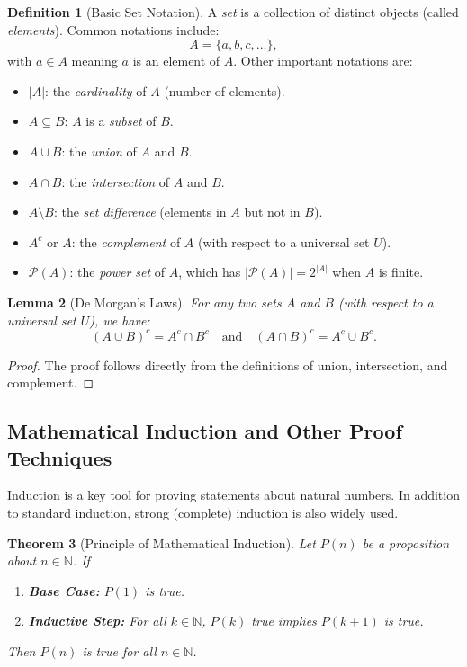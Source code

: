 \documentclass[12pt]{article}
\newtheorem{theorem}{Theorem}[section]
\newtheorem{lemma}[theorem]{Lemma}
\theoremstyle{definition}
\newtheorem{definition}[theorem]{Definition}
\begin{document}
\begin{definition}[Basic Set Notation]
  A \emph{set} is a collection of distinct objects (called \emph{elements}). Common notations include:
  \[
  A = \{ a, b, c, \dots \},
  \]
  with \(a \in A\) meaning \(a\) is an element of \(A\). Other important notations are:
  \begin{itemize}[itemsep=3pt]
    \item \(|A|\): the \emph{cardinality} of \(A\) (number of elements).
    \item \(A \subseteq B\): \(A\) is a \emph{subset} of \(B\).
    \item \(A \cup B\): the \emph{union} of \(A\) and \(B\).
    \item \(A \cap B\): the \emph{intersection} of \(A\) and \(B\).
    \item \(A \setminus B\): the \emph{set difference} (elements in \(A\) but not in \(B\)).
    \item \(A^c\) or \(\overline{A}\): the \emph{complement} of \(A\) (with respect to a universal set \(U\)).
    \item \(\mathcal{P}(A)\): the \emph{power set} of \(A\), which has \(|\mathcal{P}(A)| = 2^{|A|}\) when \(A\) is finite.
  \end{itemize}
\end{definition}

\begin{lemma}[De Morgan's Laws]
  For any two sets \(A\) and \(B\) (with respect to a universal set \(U\)), we have:
  \[
  (A \cup B)^c = A^c \cap B^c \quad \text{and} \quad (A \cap B)^c = A^c \cup B^c.
  \]
\end{lemma}
\begin{proof}
  The proof follows directly from the definitions of union, intersection, and complement.
\end{proof}

\subsection{Mathematical Induction and Other Proof Techniques}

Induction is a key tool for proving statements about natural numbers. In addition to standard induction, strong (complete) induction is also widely used.

\begin{theorem}[Principle of Mathematical Induction]
  Let \(P(n)\) be a proposition about \(n \in \mathbb{N}\). If
  \begin{enumerate}[label=(\roman*)]
    \item \textbf{Base Case:} \(P(1)\) is true.
    \item \textbf{Inductive Step:} For all \(k \in \mathbb{N}\), \(P(k)\) true implies \(P(k+1)\) is true.
  \end{enumerate}
  Then \(P(n)\) is true for all \(n \in \mathbb{N}\).
\end{theorem}
\end{document}
